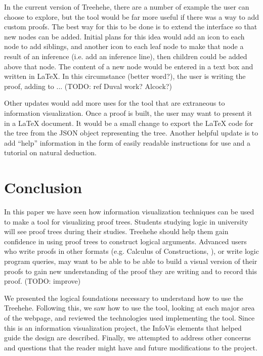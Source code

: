 \documentclass[conference]{IEEEtran}
\newcommand{\projectname}{Treehehe}
\begin{document}
In the current version of \projectname{}, there are a number of example the user can choose to explore, but the tool would be far more useful if there was a way to add custom proofs. The best way for this to be done is to extend the interface so that new nodes can be added. Initial plans for this idea would add an icon to each node to add siblings, and another icon to each leaf node to make that node a result of an inference (i.e. add an inference line), then children could be added above that node. The content of a new node would be entered in a text box and written in \LaTeX{}. In this circumstance (better word?), the user is writing the proof, adding to ... (TODO: ref Duval work? Alcock?)

Other updates would add more uses for the tool that are extraneous to information visualization. Once a proof is built, the user may want to present it in a \LaTeX{} document. It would be a small change to export the \LaTeX{} code for the tree from the JSON object representing the tree. Another helpful update is to add ``help'' information in the form of easily readable instructions for use and a tutorial on natural deduction.

\section{Conclusion}
\label{sec:conclusion}


In this paper we have seen how information visualization techniques can be used to make a tool for visualizing proof trees. Students studying logic in university will see proof trees during their studies. \projectname{} should help them gain confidence in using proof trees to construct logical arguments. Advanced users who write proofs in other formats (e.g. Calculus of Constructions, ), or write logic program queries, may want to be able to be able to build a visual version of their proofs to gain new understanding of the proof they are writing and to record this proof. (TODO: improve)

We presented the logical foundations necessary to understand how to use the \projectname{}. Following this, we saw how to use the tool, looking at each major area of the webpage, and reviewed the technologies used implementing the tool. Since this is an information visualization project, the InfoVis elements that helped guide the design are described. Finally, we attempted to address other concerns and questions that the reader might have and future modifications to the project.
\end{document}
